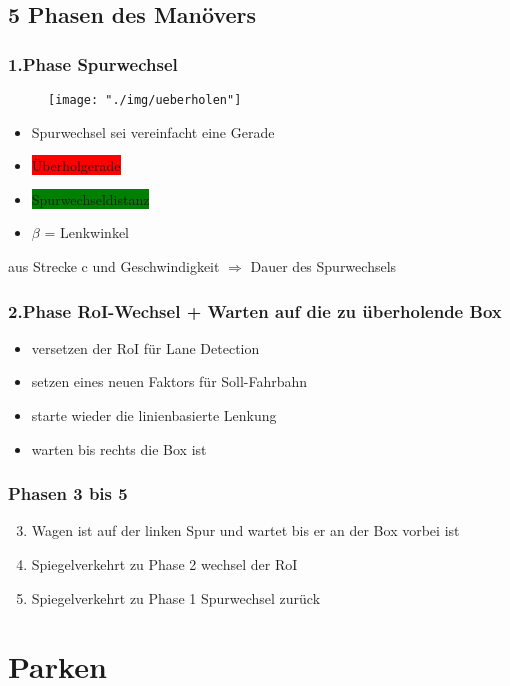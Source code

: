 \documentclass{beamer}
\begin{document}
	\subsection{5 Phasen des Manövers}
	
	\begin{frame}
		\frametitle{1.Phase Spurwechsel}
		\begin{center}
			\begin{figure}[h]
				\texttt{[image: "./img/ueberholen"]}
				\label{fig:topdown}
			\end{figure}
		\end{center}
		\begin{itemize}
			\item Spurwechsel sei vereinfacht eine Gerade
			\item \colorbox{red}{Überholgerade}
			\item \colorbox{green}{Spurwechseldistanz}
			\item $\beta$ = Lenkwinkel
		\end{itemize}
		aus Strecke c und Geschwindigkeit $\Rightarrow$  Dauer des Spurwechsels
	\end{frame}
	
	\begin{frame}
		\frametitle{2.Phase RoI-Wechsel + Warten auf die zu überholende Box}
		\begin{itemize}
			\item versetzen der RoI für Lane Detection
			\item setzen eines neuen Faktors für Soll-Fahrbahn
			\item starte wieder die linienbasierte Lenkung
			\item warten bis rechts die Box ist
		\end{itemize}
	\end{frame}
	
	\begin{frame}
		\frametitle{Phasen 3 bis 5}
		\begin{enumerate}
			\setcounter{enumi}{2}
			\item Wagen ist auf der linken Spur und wartet bis er an  der Box vorbei ist
			\item Spiegelverkehrt zu Phase 2 wechsel der RoI
			\item Spiegelverkehrt zu Phase 1 Spurwechsel zurück
		\end{enumerate}
	\end{frame}
	
	\section{Parken}
	
\end{document}
